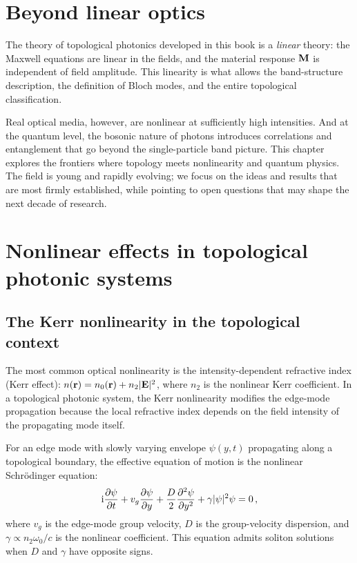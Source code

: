 
\section{Beyond linear optics}
\label{sec:ch18-beyond}

The theory of topological photonics developed in this book is a
\emph{linear} theory: the Maxwell equations are linear in the fields,
and the material response $\mathbf{M}$ is independent of field amplitude.
This linearity is what allows the band-structure description, the
definition of Bloch modes, and the entire topological classification.

Real optical media, however, are nonlinear at sufficiently high
intensities.  And at the quantum level, the bosonic nature of photons
introduces correlations and entanglement that go beyond the
single-particle band picture.  This chapter explores the frontiers
where topology meets nonlinearity and quantum physics.  The field is
young and rapidly evolving; we focus on the ideas and results that are
most firmly established, while pointing to open questions that may shape
the next decade of research.

\section{Nonlinear effects in topological photonic systems}
\label{sec:ch18-nonlinear}

\subsection{The Kerr nonlinearity in the topological context}
\label{sec:ch18-kerr}

The most common optical nonlinearity is the intensity-dependent
refractive index (Kerr effect):
$n(\mathbf{r})=n_0(\mathbf{r})+n_2|\mathbf{E}|^2$, where $n_2$ is the nonlinear
Kerr coefficient.  In a topological photonic system, the Kerr
nonlinearity modifies the edge-mode propagation because the local
refractive index depends on the field intensity of the propagating mode
itself.

For an edge mode with slowly varying envelope $\psi(y,t)$ propagating
along a topological boundary, the effective equation of motion is the
nonlinear Schr\"odinger equation:
\begin{equation}\label{eq:ch18-nlse}
  \mathrm{i}\frac{\partial \psi}{\partial t} + v_g\frac{\partial \psi}{\partial y}
  + \frac{D}{2}\frac{\partial^2\psi}{\partial y^2}
  + \gamma|\psi|^2\psi = 0\,,
\end{equation}
where $v_g$ is the edge-mode group velocity, $D$ is the group-velocity
dispersion, and $\gamma\propto n_2\omega_0/c$ is the nonlinear
coefficient.  This equation admits soliton solutions when $D$ and
$\gamma$ have opposite signs.

